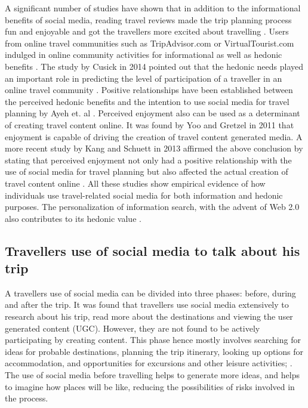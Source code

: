 A significant number of studies have shown that in addition to the informational benefits of social media, reading travel reviews made the trip planning process fun and enjoyable and got the travellers more excited about travelling \cite{10.1007/978-3-211-77280-5_4}\cite{gretzel2007online} \cite{parra2012travellers}. Users from online travel communities such as TripAdvisor.com or VirtualTourist.com indulged in online community activities for informational as well as hedonic benefits \cite{chung2008web}. The study by Cusick in 2014 pointed out that the hedonic needs played an important role in predicting the level of participation of a traveller in an online travel community \cite{doi:10.1177/0047287503258824}. Positive relationships have been established between the perceived hedonic benefits and the intention to use social media for travel planning by Ayeh et. al \cite{ayeh2013predicting}.  Perceived enjoyment also can be used as a determinant of creating travel content online. It was found by Yoo and Gretzel in 2011 that enjoyment is capable of driving the creation of travel content generated media\cite{YOO2011609}. A more recent study by Kang and Schuett in 2013 affirmed the above conclusion by stating that perceived enjoyment not only had a positive relationship with the use of social media for travel planning but also affected the actual creation of travel content online \cite{doi:10.1080/10548408.2013.751237}.
All these studies show empirical evidence of how individuals use travel-related social media for both information and hedonic purposes. The personalization of information search, with the advent of Web 2.0 also contributes to its hedonic value \cite{doi:10.1080/14616688.2012.762542}.

\subsection{Traveller\textquotesingle s use of social media to talk about his trip}\label{2.2}

A traveller\textquotesingle s use of social media can be divided into three phases: before, during and after the trip. It was found that travellers use social media extensively to research about his trip, read more about the destinations and viewing the user generated content (UGC). However, they are not found to be actively participating by creating content. This phase hence mostly involves searching for ideas for probable destinations, planning the trip itinerary, looking up options for accommodation, and opportunities for excursions and other leisure activities\cite{cox2009role}; \cite{fotis2012social}. The use of social media before travelling helps to generate more ideas, and helps to imagine how places will be like, reducing the possibilities of risks involved in the process.

